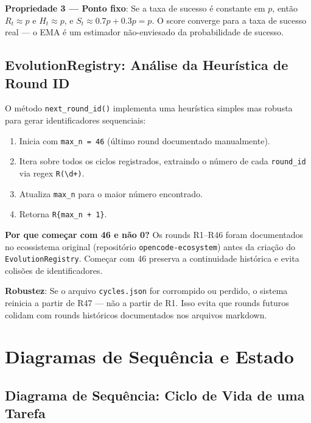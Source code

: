 \textbf{Propriedade 3 — Ponto fixo}: Se a taxa de sucesso é constante em $p$, então $R_t \approx p$ e $H_t \approx p$, e $S_t \approx 0.7p + 0.3p = p$. O score converge para a taxa de sucesso real — o EMA é um estimador não-enviesado da probabilidade de sucesso.

\subsection{EvolutionRegistry: Análise da Heurística de Round ID}

O método \texttt{next\_round\_id()} implementa uma heurística simples mas robusta para gerar identificadores sequenciais:

\begin{enumerate}
    \item Inicia com \texttt{max\_n = 46} (último round documentado manualmente).
    \item Itera sobre todos os ciclos registrados, extraindo o número de cada \texttt{round\_id} via regex \texttt{R(\textbackslash d+)}.
    \item Atualiza \texttt{max\_n} para o maior número encontrado.
    \item Retorna \texttt{R\{max\_n + 1\}}.
\end{enumerate}

\textbf{Por que começar com 46 e não 0?} Os rounds R1--R46 foram documentados no ecossistema original (repositório \texttt{opencode-ecosystem}) antes da criação do \texttt{EvolutionRegistry}. Começar com 46 preserva a continuidade histórica e evita colisões de identificadores.

\textbf{Robustez}: Se o arquivo \texttt{cycles.json} for corrompido ou perdido, o sistema reinicia a partir de R47 — não a partir de R1. Isso evita que rounds futuros colidam com rounds históricos documentados nos arquivos markdown.

\section{Diagramas de Sequência e Estado}
\label{sec:diagrams}

\subsection{Diagrama de Sequência: Ciclo de Vida de uma Tarefa}

